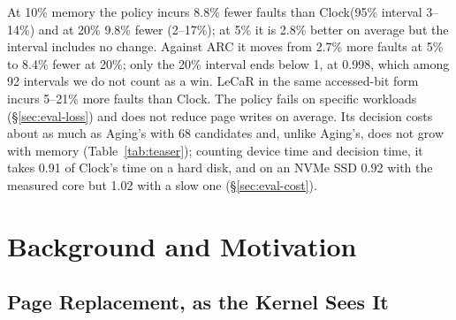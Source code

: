 \documentclass{article}
\newcommand{\clock}{Clock\xspace}
\begin{document}
At 10\% memory the policy incurs 8.8\% fewer faults than \clock (95\% interval 3--14\%)
and at 20\% 9.8\% fewer (2--17\%); at 5\% it is 2.8\% better on average but the interval
includes no change. Against ARC it moves from 2.7\% more faults at 5\% to 8.4\% fewer at
20\%; only the 20\% interval ends below 1, at 0.998, which among 92 intervals we do not
count as a win. LeCaR in the same accessed-bit form incurs 5--21\% more faults than
\clock. The policy fails on specific workloads (\S\ref{sec:eval-loss}) and does not reduce
page writes on average. Its decision costs about as much as Aging's with 68 candidates and,
unlike Aging's, does not grow with memory (Table~\ref{tab:teaser}); counting device time
and decision time, it takes
0.91 of \clock's time on a hard disk, and on an NVMe SSD 0.92 with the measured core but
1.02 with a slow one (\S\ref{sec:eval-cost}).
\section{Background and Motivation}
\label{sec:bg}

\subsection{Page Replacement, as the Kernel Sees It}
\label{sec:bg-mechanism}
\end{document}
